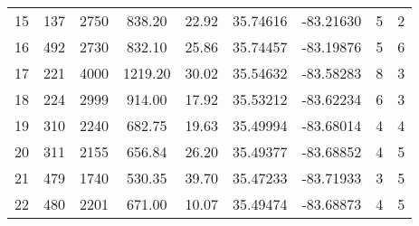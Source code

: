\begin{table}[p]
\begin{flushleft}
\begin{tabular}{ccccccccc}
15 & 137                                                 & 2750                                                          & 838.20                                                       & 22.92 & 35.74616 & -83.21630 & 5                                                                                      & 2 \\ 
16 & 492                                                 & 2730                                                          & 832.10                                                       & 25.86 & 35.74457 & -83.19876 & 5                                                                                      & 6 \\ 
17 & 221                                                 & 4000                                                          & 1219.20                                                     & 30.02 & 35.54632 & -83.58283 & 8                                                                                      & 3 \\ 
18 & 224                                                 & 2999                                                          & 914.00                                                       & 17.92 & 35.53212 & -83.62234 & 6                                                                                      & 3 \\ 
19 & 310                                                 & 2240                                                          & 682.75                                                       & 19.63 & 35.49994 & -83.68014 & 4                                                                                      & 4 \\ 
20 & 311                                                 & 2155                                                          & 656.84                                                       & 26.20 & 35.49377 & -83.68852 & 4                                                                                      & 5 \\ 
21 & 479                                                 & 1740                                                          & 530.35                                                       & 39.70 & 35.47233 & -83.71933 & 3                                                                                      & 5 \\ 
22 & 480                                                 & 2201                                                          & 671.00                                                       & 10.07 & 35.49474 & -83.68873 & 4                                                                                      & 5 \\ 

\end{tabular}
\end{flushleft}
\end{table}
